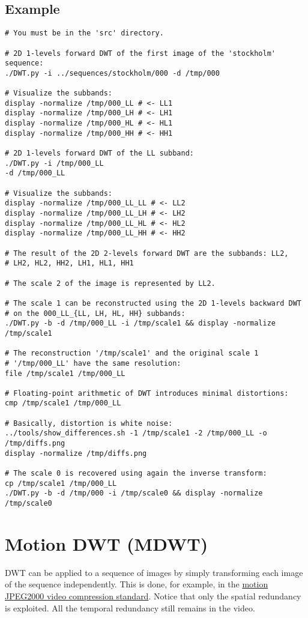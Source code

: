 \subsection{Example}
\begin{verbatim}
# You must be in the 'src' directory.

# 2D 1-levels forward DWT of the first image of the 'stockholm' sequence:
./DWT.py -i ../sequences/stockholm/000 -d /tmp/000

# Visualize the subbands:
display -normalize /tmp/000_LL # <- LL1
display -normalize /tmp/000_LH # <- LH1
display -normalize /tmp/000_HL # <- HL1
display -normalize /tmp/000_HH # <- HH1

# 2D 1-levels forward DWT of the LL subband:
./DWT.py -i /tmp/000_LL
-d /tmp/000_LL

# Visualize the subbands:
display -normalize /tmp/000_LL_LL # <- LL2
display -normalize /tmp/000_LL_LH # <- LH2
display -normalize /tmp/000_LL_HL # <- HL2
display -normalize /tmp/000_LL_HH # <- HH2

# The result of the 2D 2-levels forward DWT are the subbands: LL2,
# LH2, HL2, HH2, LH1, HL1, HH1

# The scale 2 of the image is represented by LL2.

# The scale 1 can be reconstructed using the 2D 1-levels backward DWT
# on the 000_LL_{LL, LH, HL, HH} subbands:
./DWT.py -b -d /tmp/000_LL -i /tmp/scale1 && display -normalize /tmp/scale1

# The reconstruction '/tmp/scale1' and the original scale 1
# '/tmp/000_LL' have the same resolution:
file /tmp/scale1 /tmp/000_LL

# Floating-point arithmetic of DWT introduces minimal distortions:
cmp /tmp/scale1 /tmp/000_LL

# Basically, distortion is white noise:
../tools/show_differences.sh -1 /tmp/scale1 -2 /tmp/000_LL -o /tmp/diffs.png
display -normalize /tmp/diffs.png

# The scale 0 is recovered using again the inverse transform:
cp /tmp/scale1 /tmp/000_LL
./DWT.py -b -d /tmp/000 -i /tmp/scale0 && display -normalize /tmp/scale0
\end{verbatim}

\section{Motion DWT (MDWT)}
DWT can be applied to a sequence of images by simply transforming each
image of the sequence independently. This is done, for example, in the
\href{https://en.wikipedia.org/wiki/JPEG_2000}{motion JPEG2000 video
  compression standard}. Notice that only the spatial redundancy is
exploited. All the temporal redundancy still remains in the video.

